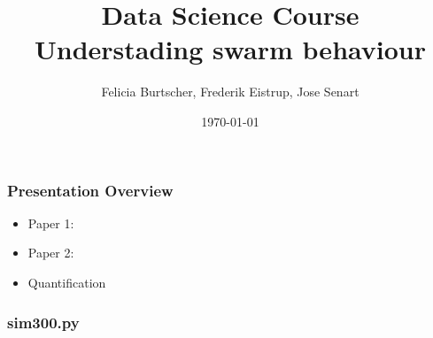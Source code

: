 \documentclass[compress]{beamer}
\title[Short title]{Data Science Course\\
\small{Understading swarm behaviour}}
\author[Grupo B4]{Felicia Burtscher, Frederik Eistrup, Jose Senart\\  %
} %
\date{\today}
\institute[FUB]{\vspace{-10pt}Freie Universität Berlin}
\begin{document}
\begin{frame}
\titlepage
\end{frame}



\begin{frame}
  \frametitle{Presentation Overview}

  \begin{itemize}
	\item Paper 1:
	\item Paper 2:
	\item Quantification
  \end{itemize}


\end{frame}

\begin{frame}
  \frametitle{sim300.py}
%
%
%
%
\end{frame}
\end{document}
